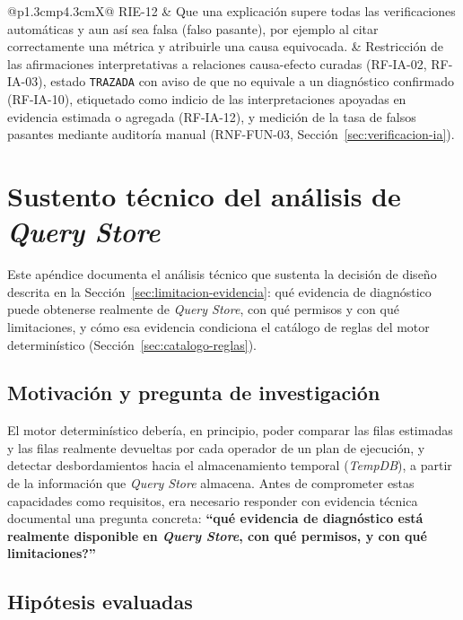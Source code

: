 \documentclass[11pt,a4paper]{report}
\begin{document}
\begin{xltabular}{\linewidth}{@{}p{1.3cm}p{4.3cm}X@{}}
RIE-12 & Que una explicaci\'on supere todas las verificaciones autom\'aticas y aun as\'i sea falsa (falso pasante), por ejemplo al citar correctamente una m\'etrica y atribuirle una causa equivocada. & Restricci\'on de las afirmaciones interpretativas a relaciones causa-efecto curadas (RF-IA-02, RF-IA-03), estado \texttt{TRAZADA} con aviso de que no equivale a un diagn\'ostico confirmado (RF-IA-10), etiquetado como indicio de las interpretaciones apoyadas en evidencia estimada o agregada (RF-IA-12), y medici\'on de la tasa de falsos pasantes mediante auditor\'ia manual (RNF-FUN-03, Secci\'on~\ref{sec:verificacion-ia}). \\
\end{xltabular}

\appendix

\chapter{Sustento t\'ecnico del an\'alisis de \textit{Query Store}}
\label{ap:spike}

Este ap\'endice documenta el an\'alisis t\'ecnico que sustenta la decisi\'on de dise\~no descrita en la Secci\'on~\ref{sec:limitacion-evidencia}: qu\'e evidencia de diagn\'ostico puede obtenerse realmente de \textit{Query Store}, con qu\'e permisos y con qu\'e limitaciones, y c\'omo esa evidencia condiciona el cat\'alogo de reglas del motor determin\'istico (Secci\'on~\ref{sec:catalogo-reglas}).

\section{Motivaci\'on y pregunta de investigaci\'on}

El motor determin\'istico deber\'ia, en principio, poder comparar las filas estimadas y las filas realmente devueltas por cada operador de un plan de ejecuci\'on, y detectar desbordamientos hacia el almacenamiento temporal (\textit{TempDB}), a partir de la informaci\'on que \textit{Query Store} almacena. Antes de comprometer estas capacidades como requisitos, era necesario responder con evidencia t\'ecnica documental una pregunta concreta: \textbf{\textquotedblleft \textquestiondown qu\'e evidencia de diagn\'ostico est\'a realmente disponible en \textit{Query Store}, con qu\'e permisos, y con qu\'e limitaciones?\textquotedblright}

\section{Hip\'otesis evaluadas}
\end{document}
